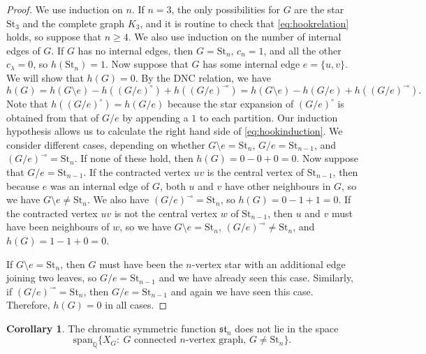 \documentclass[12pt]{amsart}  %
\theoremstyle{definition}
\newtheorem{corollary}[theorem]{Corollary}
\theoremstyle{remark}
\numberwithin{equation}{section}
\begin{document}
\begin{proof}
We use induction on $n$. If $n=3$, the only possibilities for $G$ are the star $\text{St}_3$ and the complete graph $K_3$, and it is routine to check that \eqref{eq:hookrelation} holds, so suppose that $n\geq 4$. We also use induction on the number of internal edges of $G$. If $G$ has no internal edges, then $G=\text{St}_n$, $c_n=1$, and all the other $c_\lambda=0$, so $h(\text{St}_n)=1$. Now suppose that $G$ has some internal edge $e=\{u,v\}$. We will show that $h(G)=0$. By the DNC relation, we have
\begin{equation}\label{eq:hookinduction}
h(G)=h(G\setminus e)-h((G/e)^\circ)+h((G/e)^\multimap)=h(G\setminus e)-h(G/e)+h((G/e)^\multimap).
\end{equation}
Note that $h((G/e)^\circ)=h(G/e)$ because the star expansion of $(G/e)^\circ$ is obtained from that of $G/e$ by appending a $1$ to each partition. Our induction hypothesis allows us to calculate the right hand side of \eqref{eq:hookinduction}. We consider different cases, depending on whether $G\setminus e=\text{St}_n$, $G/e=\text{St}_{n-1}$, and $(G/e)^\multimap=\text{St}_n$. If none of these hold, then $h(G)=0-0+0=0$. Now suppose that $G/e=\text{St}_{n-1}$. If the contracted vertex $uv$ is the central vertex of $\text{St}_{n-1}$, then because $e$ was an internal edge of $G$, both $u$ and $v$ have other neighbours in $G$, so we have $G\setminus e\neq\text{St}_n$. We also have $(G/e)^\multimap=\text{St}_n$, so $h(G)=0-1+1=0$. If the contracted vertex $uv$ is not the central vertex $w$ of $\text{St}_{n-1}$, then $u$ and $v$ must have been neighbours of $w$, so we have $G\setminus e=\text{St}_n$, $(G/e)^\multimap\neq\text{St}_n$, and $h(G)=1-1+0=0$. 

If $G\setminus e=\text{St}_n$, then $G$ must have been the $n$-vertex star with an additional edge joining two leaves, so $G/e=\text{St}_{n-1}$ and we have already seen this case. Similarly, if $(G/e)^\multimap=\text{St}_n$, then $G/e=\text{St}_{n-1}$ and again we have seen this case. Therefore, $h(G)=0$ in all cases. 
\end{proof}

\begin{corollary}\label{cor:star}
The chromatic symmetric function $\mathfrak{st}_n$ does not lie in the space
\begin{equation}
\text{span}_{\mathbb Q}\{X_G: \ G\text{ connected }n\text{-vertex graph, }G\neq\text{St}_n\}.
\end{equation}
\end{corollary}
\end{document}
